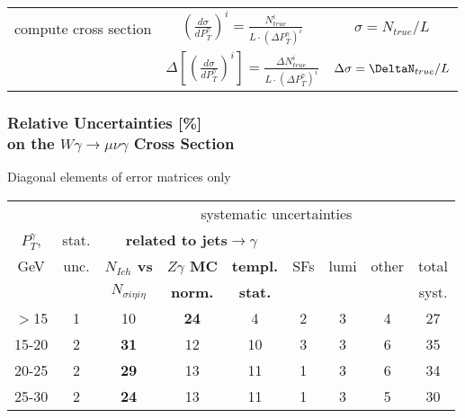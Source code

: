 \begin{frame}
\begin{table}[h]
\begin{center}
\begin{tabular}{|l|c|c|}
    compute cross section & $ \left( \frac{d\sigma}{dP_{T}^\gamma} \right) ^i = \frac{N_{true}^i}{L \cdot (\Delta P_T^\gamma)^i}$  &  $\sigma = N_{true}/L$       \\ 
                          & {\color{blue}$ \Delta \left[ \left( \frac{d\sigma}{dP_{T}^\gamma} \right) ^i \right]= \frac{\Delta N_{true}^i}{L \cdot (\Delta P_T^\gamma)^i}$ } &  {\color{blue}$\Delta\sigma = \DeltaN_{true}/L$   }    \\ \hline

  \end{tabular}
  \end{center}
\end{table}

\end{frame}%

\begin{frame}\frametitle{Relative Uncertainties [\%]\\ 
          on the $W\gamma\rightarrow\mu\nu\gamma$ Cross Section}
\footnotesize
Diagonal elements of error matrices only
\begin{table}[h]
  \tiny
  \begin{center}
   \begin{tabular}{|c|c|c|c|c|c|c|c|c|}
    \hline
                   &     & \multicolumn{7}{|c|}{systematic uncertainties}     \\
    $P_T^{\gamma}$,  & stat. & \multicolumn{3}{|c|}{\color{blue}\bfseries{related to jets$\rightarrow\gamma$}} &  &  &  & \\
    GeV           & unc. & {\color{blue}\bfseries{$N_{Ich}$ vs}} &{\color{blue}\bfseries{$Z\gamma$ MC}}      &{\color{blue}\bfseries{templ.}} & SFs & lumi & other & total\\ 
                  &     & {\color{blue}\bfseries{$N_{\sigma{i\eta i\eta}}$}} & {\color{blue}\bfseries{norm.}}    & {\color{blue}\bfseries{stat.}}  &  &  &  & syst.\\ \hline
    $>$15  & 1 & 10 & {\color{blue}\bfseries{24}} & 4 & 2 & 3 & 4 & 27 \\ \hline
    15-20 & 2 & {\color{blue}\bfseries{31}} & 12 & 10 & 3 & 3 & 6 & 35 \\ \hline
    20-25 & 2 & {\color{blue}\bfseries{29}} & 13 & 11 & 1 & 3 & 6 & 34 \\ \hline
    25-30 & 2 & {\color{blue}\bfseries{24}} & 13 & 11 & 1 & 3 & 5 & 30 \\ \hline

\end{tabular}
\end{center}
\end{table}
\end{frame}
